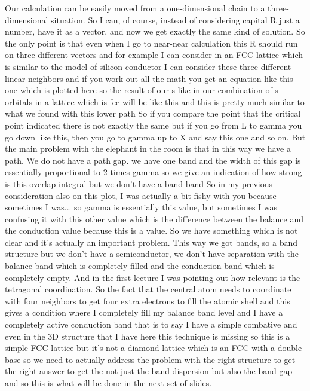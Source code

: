 Our calculation can be easily moved from a one-dimensional chain to a three-dimensional situation. So I can, of course, instead of considering capital R just a number, have it as a vector, and now we get exactly the same kind of solution. So the only point is that even when I go to near-near calculation this R should run on three different vectors and for example I can consider in an FCC lattice which is similar to the model of silicon conductor I can consider these three different linear neighbors and if you work out all the math you get an equation like this one which is plotted here so the result of our s-like in our combination of s orbitals in a lattice which is fcc will be like this and this is pretty much similar to what we found with this lower path So if you compare the point that the critical point indicated there is not exactly the same but if you go from L to gamma you go down like this, then you go to gamma up to X and say this one and so on. But the main problem with the elephant in the room is that in this way we have a path. We do not have a path gap. we have one band and the width of this gap is essentially proportional to 2 times gamma so we give an indication of how strong is this overlap integral but we don't have a band-band So in my previous consideration also on this plot, I was actually a bit fishy with you because sometimes I was... so gamma is essentially this value, but sometimes I was confusing it with this other value which is the difference between the balance and the conduction value because this is a value. So we have something which is not clear and it's actually an important problem. This way we got bands, so a band structure but we don't have a semiconductor, we don't have separation with the balance band which is completely filled and the conduction band which is completely empty. And in the first lecture I was pointing out how relevant is the tetragonal coordination. So the fact that the central atom needs to coordinate with four neighbors to get four extra electrons to fill the atomic shell and this gives a condition where I completely fill my balance band level and I have a completely active conduction band that is to say I have a simple combative and even in the 3D structure that I have here this technique is missing so this is a simple FCC lattice but it's not a diamond lattice which is an FCC with a double base so we need to actually address the problem with the right structure to get the right answer to get the not just the band dispersion but also the band gap and so this is what will be done in the next set of slides.


